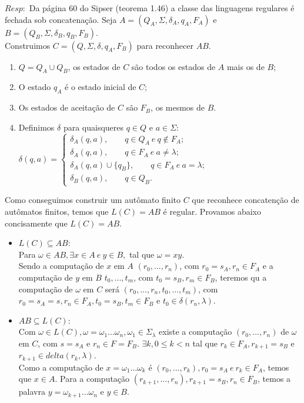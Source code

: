 \documentclass{homework}
\begin{document}
	$Resp:$ Da página 60 do Sipser (teorema 1.46) a classe das linguagens regulares é fechada sob concatenação.
	Seja $A =(Q_A,\Sigma,\delta_A,q_A,F_A)$ e $B = (Q_B,\Sigma,\delta_B,q_B,F_B)$.\\
	Construimos $C = (Q,\Sigma,\delta,q_A,F_B)$ para reconhecer $AB$.
	\begin{enumerate}
		\item $Q = Q_A \cup Q_B$, os estados de $C$ são todos os estados de $A$ mais os de $B$;
		\item O estado $q_A$ é o estado inicial de $C$;
		\item Os estados de aceitação de $C$ são $F_B$, os mesmos de $B$. 
		\item Definimos $\delta$ para quaisqueres $q \in Q$ e $a \in \Sigma$:\\
		$\delta(q,a) = \begin{cases}
							\delta_A(q,a),\qquad q \in Q_A \ e \ q \notin F_A;\\
							\delta_A(q,a),\qquad q \in F_A \ e \ a \neq \lambda;\\
							\delta_A(q,a) \cup \{q_B\},\qquad q \in F_A \ e \ a = \lambda;\\
							\delta_B(q,a), \qquad  q \in Q_B.
					   \end{cases}					  
		$
	\end{enumerate}
	Como conseguimos construir um autômato finito $C$ que reconhece concatenção de autômatos finitos, temos que $L(C) = AB$ é regular. Provamos abaixo concisamente que $L(C) = AB$. 
	\begin{itemize}
		\item $L(C) \subseteq AB$:\\
			Para $\omega \in AB, \exists x \in A\ e\ y \in B,$ tal que $\omega=xy$.\\
			Sendo a computação de $x$ em $A$ $(r_0,...,r_n)$, com $r_0=s_A,r_n \in F_A$ e a computação de $y$ em $B$ $t_0,...,t_m$, com $t_0=s_B,r_m \in F_B$, teremos qu a computação de $\omega$ em $C$ será $(r_0,...,r_n,t_0,...,t_m)$, com $r_0=s_A=s,r_n \in F_A, t_0=s_B,t_m \in F_B$ e $t_0 \in \delta(r_n,\lambda)$.
		\item $AB \subseteq L(C)$:\\
			Com $\omega \in L(C), \omega=\omega_1...\omega_n, \omega_1 \in \Sigma_\lambda$ existe a computação $(r_0,...,r_n)$ de $\omega$ em $C$, com $s=s_A$ e $r_n \in F=F_B$. $\exists k, 0 \leq k < n$ tal que $r_k \in F_A,r_{k+1}=s_B$ e $r_{k+1} \in delta(r_k, \lambda)$.\\
			Como a computação de $x=\omega_1...\omega_k$ é $(r_0,...,r_k), r_0=s_A\ e\ r_k \in F_A$, temos que $x \in A$. Para a computação $(r_{k+1},...,r_n),r_{k+1}=s_B,r_n \in F_B$, temos a palavra $y=\omega_{k+1}...\omega_n$ e $y \in B$.
	\end{itemize}
\end{document}

